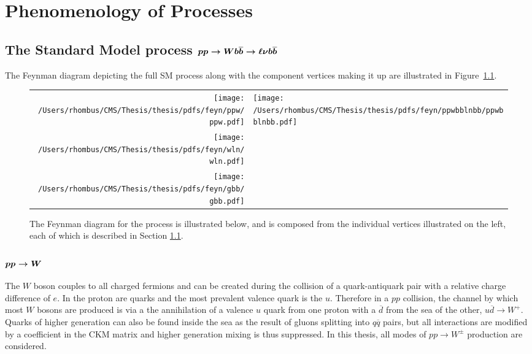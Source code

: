 

\chapter{Phenomenology of Processes}

\section[The Standard Model process \ppwbblnbb]
{The Standard Model process $\boldsymbol{pp\rightarrow Wb\overline{b}\rightarrow\ell\nu b\overline{b}}$} \label{sec:wbbproduction}

The Feynman diagram depicting the full SM process \ppwbblnbb 
 along with the component vertices making it up
 are illustrated in Figure~\ref{fig:ppwbblnbbfeyn}.

\begin{figure}[!h]
 \center
 \caption[Feynman diagrams for \ppwbblnbb]{
  The Feynman diagram for the process
   \ppwbblnbb is illustrated below,
   and is composed from the individual vertices 
   illustrated on the left, each of which is
   described in Section \ref{sec:wbbproduction}.
 } 
\begin{tabular}{rl}
 \texttt{[image: /Users/rhombus/CMS/Thesis/thesis/pdfs/feyn/ppw/ppw.pdf]} & 
 \multirow{3}{*}{\texttt{[image: /Users/rhombus/CMS/Thesis/thesis/pdfs/feyn/ppwbblnbb/ppwbblnbb.pdf]}} \\
 \texttt{[image: /Users/rhombus/CMS/Thesis/thesis/pdfs/feyn/wln/wln.pdf]} & {} \\
 \texttt{[image: /Users/rhombus/CMS/Thesis/thesis/pdfs/feyn/gbb/gbb.pdf]} & {}
\end{tabular} 
    \label{fig:ppwbblnbbfeyn}
\end{figure}

 \subsection[\ppw]
 {$\boldsymbol{pp\rightarrow W}$}

  The $W$ boson couples to all charged fermions
   and can be
   created during the collision of a quark-antiquark
   pair with a relative charge difference of $e$.
  In the proton are quarks and the most prevalent valence
   quark is the $u$.
  Therefore in a $pp$ collision,
   the channel by which most
   $W$ bosons are produced is
   via a the annihilation of a valence $u$ quark
   from one proton with 
   a $\overline{d}$ from the sea of the other,
   $u\overline{d}\rightarrow W^+$.
  Quarks of higher generation can also be found
   inside the sea as the result of gluons splitting into
   $q\overline{q}$ pairs, but all interactions
   are modified by a coefficient in the CKM matrix
   and higher generation mixing is thus suppressed.
  In this thesis, all modes of $pp\rightarrow W^\pm$ production are
   considered.

